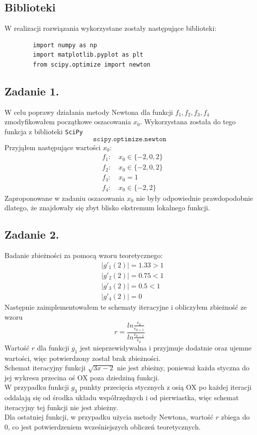 \documentclass[11pt, leqno]{scrartcl}
\begin{document}
    \subsection{Biblioteki}
    W realizacji rozwiązania wykorzystane zostały następujące
    biblioteki:
    \begin{lstlisting}
        import numpy as np
        import matplotlib.pyplot as plt
        from scipy.optimize import newton
    \end{lstlisting}

    \subsection{Zadanie 1.}
    W celu poprawy działania metody Newtona dla funkcji
    $f_1,f_2,f_3,f_4$ zmodyfikowałem początkowe oszacowania
    $x_0$. Wykorzystana została do tego funkcja z biblioteki
    \texttt{SciPy}
    \[
        \texttt{scipy.optimize.newton}
    \]
    Przyjąłem następujące wartości $x_0$:
    \begin{align*}
        &f_1: \quad x_0\in \{-2,0,2\} \\
        &f_2: \quad x_0\in \{-2,0,2\} \\
        &f_3: \quad x_0=1 \\
        &f_4: \quad x_0\in \{-2,2\}
    \end{align*}
    Zaproponowane w zadaniu oszacowania $x_0$ nie były
    odpowiednie prawdopodobnie dlatego, że znajdowały się
    zbyt blisko ekstremum lokalnego funkcji.

    \subsection{Zadanie 2.}
    Badanie zbieżności za pomocą wzoru teoretycznego:
    \begin{align*}
        &|g'_1(2)|=1.33>1 \\
        &|g'_2(2)|=0.75<1 \\
        &|g'_3(2)|=0.5<1 \\
        &|g'_4(2)|=0
    \end{align*}
    Następnie zaimplementowałem te schematy iteracyjne
    i obliczyłem zbieżność ze wzoru
    \[
        r=\frac{ln\frac{\epsilon_k}{\epsilon_{k+1}}}
            {ln\frac{\epsilon_{k-1}}{\epsilon_k}}
    \]
    Wartość $r$ dla funkcji $g_1$ jest nieprzewidywalna
    i przyjmuje dodatnie oraz ujemne wartości, więc
    potwierdzony został brak zbieżności. \\
    Schemat iteracyjny funkcji $\sqrt{3x-2}$ nie jest
    zbieżny, ponieważ każda styczna do jej wykresu
    przecina oś OX poza dziedziną funkcji. \\
    W przypadku funkcji $g_3$ punkty przecięcia
    stycznych z osią OX po każdej iteracji oddalają
    się od środka układu współrzędnych i od pierwiastka,
    więc schemat iteracyjny tej funkcji nie jest
    zbieżny. \\
    Dla ostatniej funkcji, w przypadku użycia metody
    Newtona, wartość $r$ zbiega do 0, co jest
    potwierdzeniem wcześniejszych obliczeń teoretycznych.
    
\end{document}
